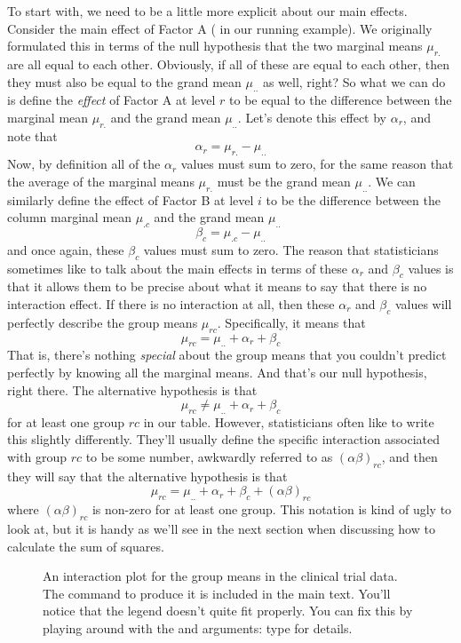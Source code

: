 To start with, we need to be a little more explicit about our main effects. Consider the main effect of Factor A ( in our running example). We originally formulated this in terms of the null hypothesis that the two marginal means $\mu_{r.}$ are all equal to each other. Obviously, if all of these are equal to each other, then they must also be equal to the grand mean $\mu_{..}$ as well, right? So what we can do is define the {\it effect} of Factor A at level $r$ to be equal to the difference between the marginal mean $\mu_{r.}$ and the grand mean $\mu_{..}$.  
Let's denote this effect by $\alpha_r$, and note that
$$
\alpha_r  = \mu_{r.} - \mu_{..} 
$$
Now, by definition all of the $\alpha_r$ values must sum to zero, for the same reason that the average of the marginal means $\mu_{r.}$ must be the grand mean $\mu_{..}$. We can similarly define the effect of Factor B at level $i$ to be the difference between the column marginal mean $\mu_{.c}$ and the grand mean $\mu_{..}$
$$
\beta_c = \mu_{.c} - \mu_{..}
$$
and once again, these $\beta_c$ values must sum to zero. The reason that statisticians sometimes like to talk about the main effects in terms of these $\alpha_r$ and $\beta_c$ values is that it allows them to be precise about what it means to say that there is no interaction effect. If there is no interaction at all, then these $\alpha_r$ and $\beta_c$ values will perfectly describe the group means $\mu_{rc}$. Specifically, it means that
$$
\mu_{rc} = \mu_{..} + \alpha_r + \beta_c 
$$
That is, there's nothing {\it special} about the group means that you couldn't predict perfectly by knowing all the marginal means. And that's our null hypothesis, right there. The alternative hypothesis is that
$$
\mu_{rc} \neq \mu_{..} + \alpha_r + \beta_c 
$$
for at least one group $rc$ in our table. However, statisticians often like to write this slightly differently. They'll usually define the specific interaction associated with group $rc$ to be some number, awkwardly referred to as $(\alpha\beta)_{rc}$, and then they will say that the alternative hypothesis is that 
$$\mu_{rc} = \mu_{..} + \alpha_r + \beta_c + (\alpha\beta)_{rc}$$
where $(\alpha\beta)_{rc}$ is non-zero for at least one group. This notation is kind of ugly to look at, but it is handy as we'll see in the next section when discussing how to calculate the sum of squares.


\begin{figure}[t]
\begin{center}
\caption{An interaction plot for the group means in the clinical trial data. The command to produce it is included in the main text. You'll notice that the legend doesn't quite fit properly. You can fix this by playing around with the  and  arguments: type  for details.}
\label{fig:interactionplot}
\HR
\end{center}
\end{figure}


